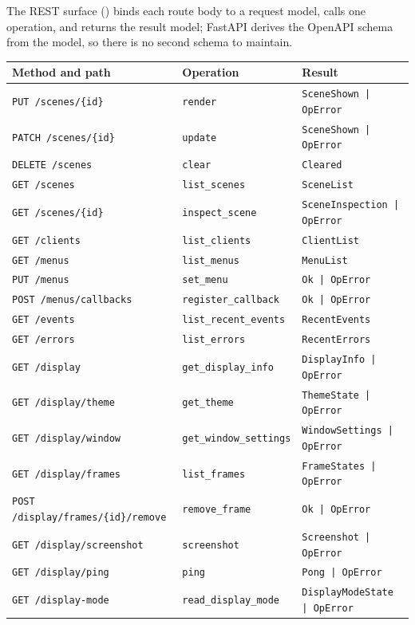 \documentclass[a4paper,10pt]{article}
\newcommand{\modpath}[1]{\path{src/punt_lux/#1}}
\begin{document}
The REST surface (\modpath{rest/}) binds each route body to a request
model, calls one operation, and returns the result model; FastAPI derives
the OpenAPI schema from the model, so there is no second schema to maintain.

\begin{center}
\begin{tabular}{llp{4.5cm}}
\toprule
\textbf{Method and path} & \textbf{Operation} & \textbf{Result} \\
\midrule
\texttt{PUT /scenes/\{id\}}          & \texttt{render}       & \texttt{SceneShown | OpError} \\
\texttt{PATCH /scenes/\{id\}}        & \texttt{update}       & \texttt{SceneShown | OpError} \\
\texttt{DELETE /scenes}              & \texttt{clear}        & \texttt{Cleared} \\
\texttt{GET /scenes}                 & \texttt{list\_scenes} & \texttt{SceneList} \\
\texttt{GET /scenes/\{id\}}          & \texttt{inspect\_scene} & \texttt{SceneInspection | OpError} \\
\texttt{GET /clients}                & \texttt{list\_clients} & \texttt{ClientList} \\
\texttt{GET /menus}                  & \texttt{list\_menus}  & \texttt{MenuList} \\
\texttt{PUT /menus}                  & \texttt{set\_menu}    & \texttt{Ok | OpError} \\
\texttt{POST /menus/callbacks}       & \texttt{register\_callback} & \texttt{Ok | OpError} \\
\texttt{GET /events}                 & \texttt{list\_recent\_events} & \texttt{RecentEvents} \\
\texttt{GET /errors}                 & \texttt{list\_errors} & \texttt{RecentErrors} \\
\texttt{GET /display}                & \texttt{get\_display\_info} & \texttt{DisplayInfo | OpError} \\
\texttt{GET /display/theme}          & \texttt{get\_theme} & \texttt{ThemeState | OpError} \\
\texttt{GET /display/window}         & \texttt{get\_window\_settings} & \texttt{WindowSettings | OpError} \\
\texttt{GET /display/frames}         & \texttt{list\_frames} & \texttt{FrameStates | OpError} \\
\texttt{POST /display/frames/\{id\}/remove} & \texttt{remove\_frame} & \texttt{Ok | OpError} \\
\texttt{GET /display/screenshot}     & \texttt{screenshot}   & \texttt{Screenshot | OpError} \\
\texttt{GET /display/ping}           & \texttt{ping}         & \texttt{Pong | OpError} \\
\texttt{GET /display-mode}           & \texttt{read\_display\_mode} & \texttt{DisplayModeState | OpError} \\
\bottomrule
\end{tabular}
\end{center}
\end{document}
